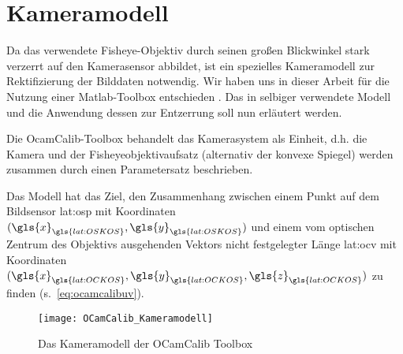 \section{Kameramodell} \label{sec:kameramodell}
Da das verwendete Fisheye-Objektiv durch seinen großen Blickwinkel stark verzerrt auf den Kamerasensor abbildet, ist ein spezielles Kameramodell zur Rektifizierung der Bilddaten notwendig. Wir haben uns in dieser Arbeit für die Nutzung einer Matlab-Toolbox entschieden  \autocite{OCamCalibOmnidirectionalCamera, scaramuzzaFlexibleTechniqueAccurate2006, scaramuzzaToolboxEasilyCalibrating2006, scaramuzzaOmnidirectionalVisionCalibration2007, rufliAutomaticDetectionCheckerboards2008}. Das in selbiger verwendete Modell und die Anwendung dessen zur Entzerrung soll nun erläutert werden. 

Die OcamCalib-Toolbox behandelt das Kamerasystem als Einheit, d.h. die Kamera und der Fisheyeobjektivaufsatz (alternativ der konvexe Spiegel) werden zusammen durch einen Parametersatz beschrieben.

Das Modell hat das Ziel, den Zusammenhang zwischen einem Punkt auf dem Bildsensor \gls{lat:osp} mit Koordinaten \((\gls{x}_{\gls{lat:OSKOS}}, \gls{y}_{\gls{lat:OSKOS}})\) und einem vom optischen Zentrum des Objektivs ausgehenden Vektors nicht festgelegter Länge \gls{lat:ocv} mit Koordinaten \((\gls{x}_{\gls{lat:OCKOS}}, \gls{y}_{\gls{lat:OCKOS}}, \gls{z}_{\gls{lat:OCKOS}})\) zu finden (s.~\eqref{eq:ocamcalibuv}).

\begin{figure}[H]
  \centering
  \texttt{[image: OCamCalib\_Kameramodell]}
  \caption{Das Kameramodell der OCamCalib Toolbox}
  \label{fig:kameramodell}
\end{figure}

